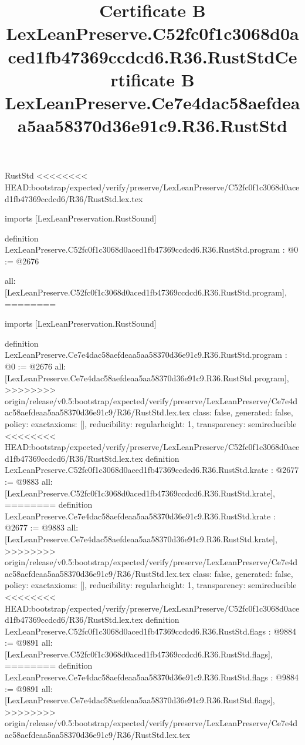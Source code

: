 \begin{lexlean}{RustStd}
<<<<<<<< HEAD:bootstrap/expected/verify/preserve/LexLeanPreserve/C52fc0f1c3068d0aced1fb47369ccdcd6/R36/RustStd.lex.tex
\title{Certificate B LexLeanPreserve.C52fc0f1c3068d0aced1fb47369ccdcd6.R36.RustStd}
\begin{coremodule}
imports [LexLeanPreservation.RustSound]

definition LexLeanPreserve.C52fc0f1c3068d0aced1fb47369ccdcd6.R36.RustStd.program : @0 := @2676 {
  all: [LexLeanPreserve.C52fc0f1c3068d0aced1fb47369ccdcd6.R36.RustStd.program],
========
\title{Certificate B LexLeanPreserve.Ce7e4dac58aefdeaa5aa58370d36e91c9.R36.RustStd}
\begin{coremodule}
imports [LexLeanPreservation.RustSound]

definition LexLeanPreserve.Ce7e4dac58aefdeaa5aa58370d36e91c9.R36.RustStd.program : @0 := @2676 {
  all: [LexLeanPreserve.Ce7e4dac58aefdeaa5aa58370d36e91c9.R36.RustStd.program],
>>>>>>>> origin/release/v0.5:bootstrap/expected/verify/preserve/LexLeanPreserve/Ce7e4dac58aefdeaa5aa58370d36e91c9/R36/RustStd.lex.tex
  class: false,
  generated: false,
  policy: exact{axioms: []},
  reducibility: regular{height: 1},
  transparency: semireducible
}
<<<<<<<< HEAD:bootstrap/expected/verify/preserve/LexLeanPreserve/C52fc0f1c3068d0aced1fb47369ccdcd6/R36/RustStd.lex.tex
definition LexLeanPreserve.C52fc0f1c3068d0aced1fb47369ccdcd6.R36.RustStd.krate : @2677 := @9883 {
  all: [LexLeanPreserve.C52fc0f1c3068d0aced1fb47369ccdcd6.R36.RustStd.krate],
========
definition LexLeanPreserve.Ce7e4dac58aefdeaa5aa58370d36e91c9.R36.RustStd.krate : @2677 := @9883 {
  all: [LexLeanPreserve.Ce7e4dac58aefdeaa5aa58370d36e91c9.R36.RustStd.krate],
>>>>>>>> origin/release/v0.5:bootstrap/expected/verify/preserve/LexLeanPreserve/Ce7e4dac58aefdeaa5aa58370d36e91c9/R36/RustStd.lex.tex
  class: false,
  generated: false,
  policy: exact{axioms: []},
  reducibility: regular{height: 1},
  transparency: semireducible
}
<<<<<<<< HEAD:bootstrap/expected/verify/preserve/LexLeanPreserve/C52fc0f1c3068d0aced1fb47369ccdcd6/R36/RustStd.lex.tex
definition LexLeanPreserve.C52fc0f1c3068d0aced1fb47369ccdcd6.R36.RustStd.flags : @9884 := @9891 {
  all: [LexLeanPreserve.C52fc0f1c3068d0aced1fb47369ccdcd6.R36.RustStd.flags],
========
definition LexLeanPreserve.Ce7e4dac58aefdeaa5aa58370d36e91c9.R36.RustStd.flags : @9884 := @9891 {
  all: [LexLeanPreserve.Ce7e4dac58aefdeaa5aa58370d36e91c9.R36.RustStd.flags],
>>>>>>>> origin/release/v0.5:bootstrap/expected/verify/preserve/LexLeanPreserve/Ce7e4dac58aefdeaa5aa58370d36e91c9/R36/RustStd.lex.tex
}}}
\end{coremodule}}
\end{coremodule}
\end{lexlean}

